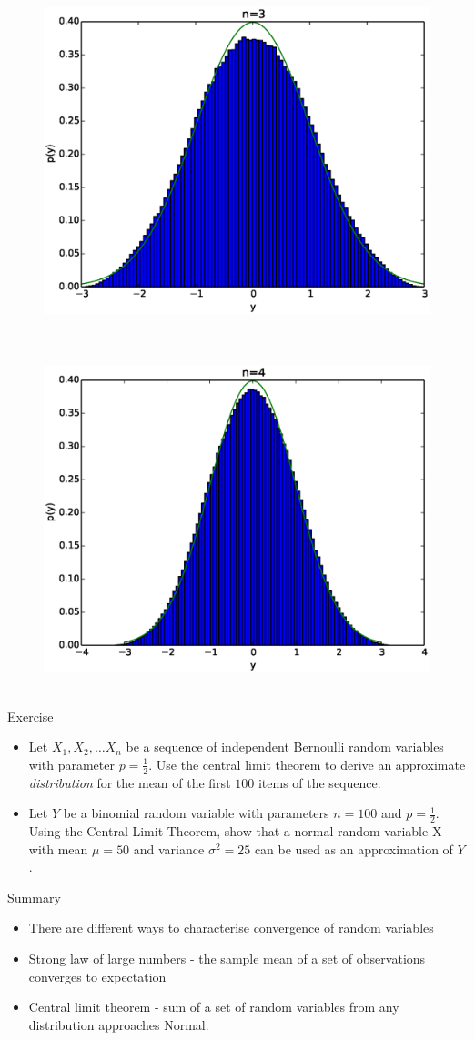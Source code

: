 \documentclass{beamer}
\begin{document}
\begin{frame} 
  \begin{figure}[htp]
\mbox{
\includegraphics[width=0.5\linewidth]{clt2.eps}
}
\end{figure} 
\end{frame}


\begin{frame} 
  \begin{figure}[htp]
\mbox{
\includegraphics[width=0.5\linewidth]{clt3.eps}
}
\end{figure} 
\end{frame}

\begin{frame}{Exercise}  
\begin{itemize} 
 \item Let $X_1, X_2, \ldots X_n$ be a sequence of independent Bernoulli random variables with parameter $p = \frac{1}{2}$. Use the central limit theorem to derive an approximate \emph{distribution} for the mean of the first $100$ items of the sequence. 
  \item Let $Y$ be a binomial random variable with parameters $n=100$ and $p = \frac{1}{2}$. Using the Central Limit Theorem, show that a normal random variable X with mean $\mu =50$ and variance $\sigma^{2}=25$ can be used as an approximation of $Y$. 
\end{itemize}
\end{frame}


\begin{frame}{Summary} 
\begin{itemize} 
 \item There are different ways to characterise convergence of random variables 
 \item Strong law of large numbers - the sample mean of a set of observations converges to expectation 
 \item Central limit theorem - sum of a set of random variables from any distribution approaches Normal. 
\end{itemize}
 
\end{frame}
\end{document}
